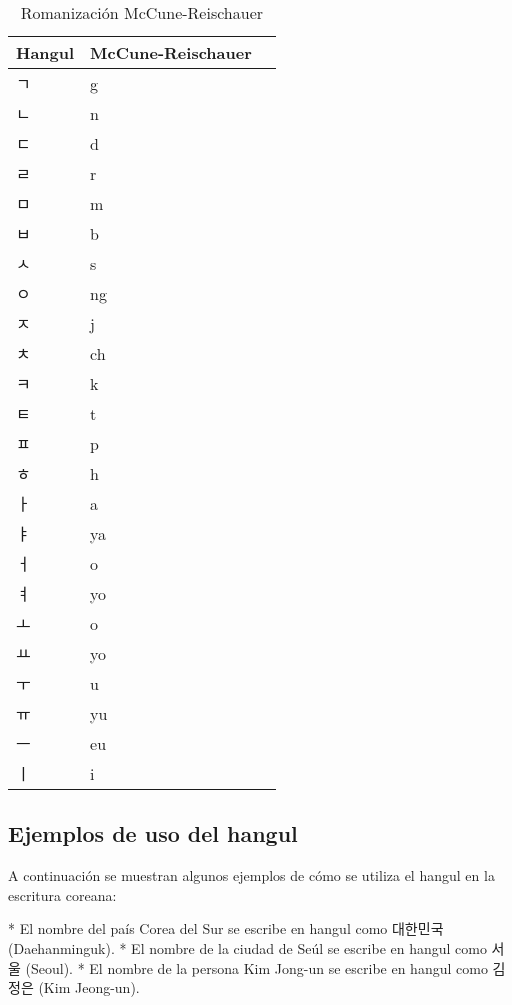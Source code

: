 \begin{table}[t]
	\caption{Romanización McCune-Reischauer}
	\begin{center}
		\begin{tabular}{ | m{2cm} | m{5cm} | m{5cm} | }
			\hline Hangul & McCune-Reischauer \\ \hline
			ㄱ & g \\
			ㄴ & n \\
			ㄷ & d \\
			ㄹ & r \\
			ㅁ & m \\
			ㅂ & b \\
			ㅅ & s \\
			ㅇ & ng \\
			ㅈ & j \\
			ㅊ & ch \\
			ㅋ & k \\
			ㅌ & t \\
			ㅍ & p \\
			ㅎ & h \\
			ㅏ & a \\
			ㅑ & ya \\
			ㅓ & o \\
			ㅕ & yo \\
			ㅗ & o \\
			ㅛ & yo \\
			ㅜ & u \\
			ㅠ & yu \\
			ㅡ & eu \\
			ㅣ & i \\ \hline
		\end{tabular}
	\end{center}
\end{table}



























\subsection{Ejemplos de uso del hangul}

A continuación se muestran algunos ejemplos de cómo se utiliza el hangul en la escritura coreana:

* El nombre del país Corea del Sur se escribe en hangul como 대한민국 (Daehanminguk).
* El nombre de la ciudad de Seúl se escribe en hangul como 서울 (Seoul).
* El nombre de la persona Kim Jong-un se escribe en hangul como 김정은 (Kim Jeong-un).